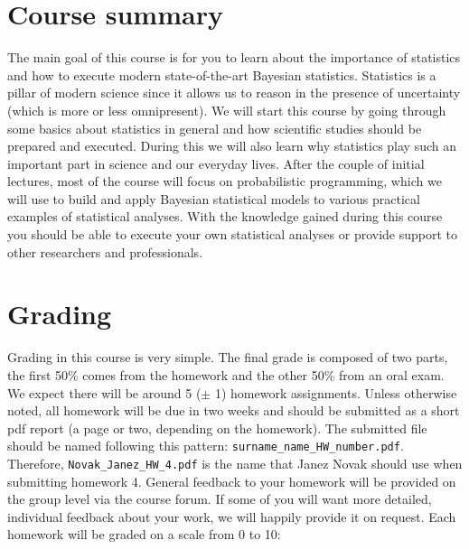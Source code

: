 \documentclass[fleqn,moreauthors,10pt]{ds_report}
\begin{document}
\flushbottom

\maketitle

\thispagestyle{empty}



\section*{Course summary}

The main goal of this course is for you to learn about the importance of statistics and how to execute modern state-of-the-art Bayesian statistics. Statistics is a pillar of modern science since it allows us to reason in the presence of uncertainty (which is more or less omnipresent). We will start this course by going through some basics about statistics in general and how scientific studies should be prepared and executed. During this we will also learn why statistics play such an important part in science and our everyday lives. After the couple of initial lectures, most of the course will focus on probabilistic programming, which we will use to build and apply Bayesian statistical models to various practical examples of statistical analyses. With the knowledge gained during this course you should be able to execute your own statistical analyses or provide support to other researchers and professionals.

\section*{Grading}

Grading in this course is very simple. The final grade is composed of two parts, the first 50\% comes from the homework and the other 50\% from an oral exam. We expect there will be around 5 ($\pm$ 1) homework assignments. Unless otherwise noted, all homework will be due in two weeks and should be submitted as a short pdf report (a page or two, depending on the homework). The submitted file should be named following this pattern: \texttt{surname\_name\_HW\_number.pdf}. Therefore, \texttt{Novak\_Janez\_HW\_4.pdf} is the name that Janez Novak should use when submitting homework 4. General feedback to your homework will be provided on the group level via the course forum. If some of you will want more detailed, individual feedback about your work, we will happily provide it on request. Each homework will be graded on a scale from 0 to 10:
\end{document}
